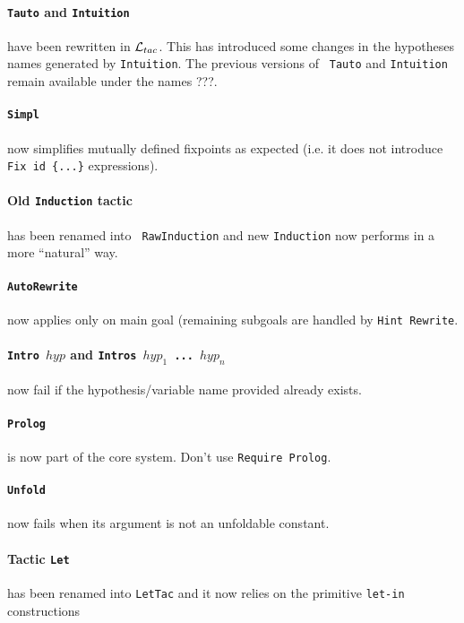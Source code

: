 \documentclass[11pt]{article}
\begin{document}
   \paragraph{{\tt Tauto} and {\bf\tt Intuition}} have been rewritten
   in ${\cal L}_{tac}$. This has introduced some changes in the hypotheses names
   generated by {\tt Intuition}. The previous versions of {\tt
   Tauto} and {\tt Intuition} remain available under the names
   ???.

  \paragraph{{\tt Simpl}} now simplifies mutually defined fixpoints
  as expected (i.e. it does not introduce {\tt Fix id
  \{...\}} expressions).

  \paragraph{Old {\tt Induction} tactic} has been renamed into {\tt
  RawInduction} and new {\tt Induction} now performs in a more
  ``natural'' way.

  \paragraph{{\tt AutoRewrite}} now applies only on main goal (remaining
  subgoals are handled by {\tt Hint Rewrite}.

  \paragraph{{\tt Intro $hyp$} and {\bf \tt Intros $hyp_1$ ... $hyp_n$}}
  now fail if the hypothesis/variable name provided already exists.

  \paragraph{{\tt Prolog}} is now part of the core
  system. Don't use {\tt Require Prolog}.

  \paragraph{{\tt Unfold}} now fails when its argument is not an
  unfoldable constant.

  \paragraph{Tactic {\tt Let}} has been renamed into {\tt LetTac}
  and it now relies on the primitive {\tt let-in} constructions
\end{document}
